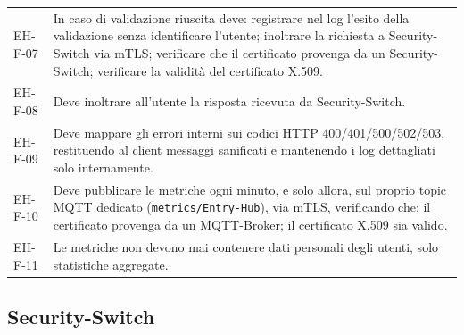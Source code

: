 \begin{longtable}{p{2.6cm} p{\dimexpr\linewidth-2.6cm-4\tabcolsep\relax}}
EH-F-07 & In caso di validazione riuscita deve: registrare nel log l'esito della validazione senza identificare l'utente; inoltrare la richiesta a Security-Switch via mTLS; verificare che il certificato provenga da un Security-Switch; verificare la validità del certificato X.509. \\
EH-F-08 & Deve inoltrare all'utente la risposta ricevuta da Security-Switch. \\
EH-F-09 & Deve mappare gli errori interni sui codici HTTP 400/401/500/502/503, restituendo al client messaggi sanificati e mantenendo i log dettagliati solo internamente. \\
EH-F-10 & Deve pubblicare le metriche ogni minuto, e solo allora, sul proprio topic MQTT dedicato (\texttt{metrics/Entry-Hub}), via mTLS, verificando che: il certificato provenga da un MQTT-Broker; il certificato X.509 sia valido. \\
EH-F-11 & Le metriche non devono mai contenere dati personali degli utenti, solo statistiche aggregate. \\
\end{longtable}

\subsection{Security-Switch}

